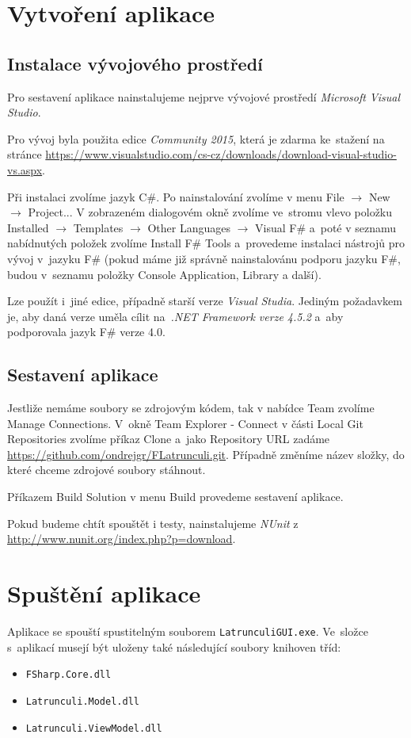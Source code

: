 \documentclass[12pt]{article}
\begin{document}
\section{Vytvoření aplikace}
\subsection{Instalace vývojového prostředí}
Pro sestavení aplikace nainstalujeme nejprve vývojové prostředí \emph{Microsoft Visual Studio}.

Pro vývoj byla použita edice \emph{Community 2015}, která je zdarma ke~stažení na stránce \url{https://www.visualstudio.com/cs-cz/downloads/download-visual-studio-vs.aspx}. 

Při instalaci zvolíme jazyk C\#. Po nainstalování zvolíme v menu File $\rightarrow$ New $\rightarrow$ Project... V zobrazeném dialogovém okně zvolíme ve~stromu vlevo položku Installed $\rightarrow$ Templates $\rightarrow$ Other Languages $\rightarrow$ Visual F\# a~poté v seznamu nabídnutých položek zvolíme Install F\# Tools a~provedeme instalaci nástrojů pro vývoj v~jazyku F\# (pokud máme již správně nainstalovánu podporu jazyku F\#, budou v~seznamu položky Console Application, Library a další).

Lze použít i~jiné edice, případně starší verze \emph{Visual Studia}. Jediným požadavkem je, aby daná verze uměla cílit na~\emph{.NET Framework verze 4.5.2} a~aby podporovala jazyk F\# verze 4.0.
\subsection{Sestavení aplikace}
Jestliže nemáme soubory se zdrojovým kódem, tak v nabídce Team zvolíme Manage Connections. V~okně Team Explorer - Connect v části Local Git Repositories zvolíme příkaz Clone a~jako Repository URL zadáme \url{https://github.com/ondrejgr/FLatrunculi.git}. Případně změníme název složky, do které chceme zdrojové soubory stáhnout.

Příkazem Build Solution v menu Build provedeme sestavení aplikace.

Pokud budeme chtít spouštět i testy, nainstalujeme \emph{NUnit} z \url{http://www.nunit.org/index.php?p=download}.

\section{Spuštění aplikace}
Aplikace se spouští spustitelným souborem \texttt{LatrunculiGUI.exe}. Ve~složce s~aplikací musejí být uloženy také následující soubory knihoven tříd:
	\begin{itemize}  
		\item \texttt{FSharp.Core.dll}
		\item \texttt{Latrunculi.Model.dll}
		\item \texttt{Latrunculi.ViewModel.dll}
	\end{itemize}
\end{document}
